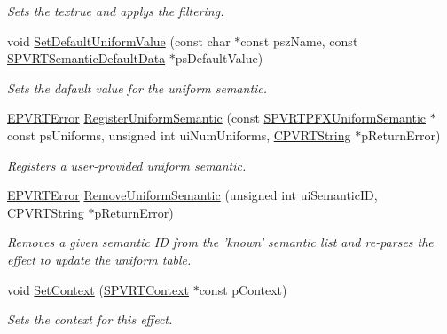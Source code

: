 \begin{DoxyCompactItemize}
\begin{DoxyCompactList}\small\item\em Sets the textrue and applys the filtering. \end{DoxyCompactList}\item 
void \hyperlink{class_c_p_v_r_t_p_f_x_effect_a3b08f2f371bf7aad946a8783631371a2}{Set\+Default\+Uniform\+Value} (const char $\ast$const psz\+Name, const \hyperlink{struct_s_p_v_r_t_semantic_default_data}{S\+P\+V\+R\+T\+Semantic\+Default\+Data} $\ast$ps\+Default\+Value)
\begin{DoxyCompactList}\small\item\em Sets the dafault value for the uniform semantic. \end{DoxyCompactList}\item 
\hyperlink{_p_v_r_t_error_8h_a9e837ff1a83f3a5f332bc4cc78454608}{E\+P\+V\+R\+T\+Error} \hyperlink{class_c_p_v_r_t_p_f_x_effect_a50041cb94518a8c4204e7b188cb45bff}{Register\+Uniform\+Semantic} (const \hyperlink{struct_s_p_v_r_t_p_f_x_uniform_semantic}{S\+P\+V\+R\+T\+P\+F\+X\+Uniform\+Semantic} $\ast$const ps\+Uniforms, unsigned int ui\+Num\+Uniforms, \hyperlink{class_c_p_v_r_t_string}{C\+P\+V\+R\+T\+String} $\ast$p\+Return\+Error)
\begin{DoxyCompactList}\small\item\em Registers a user-\/provided uniform semantic. \end{DoxyCompactList}\item 
\hyperlink{_p_v_r_t_error_8h_a9e837ff1a83f3a5f332bc4cc78454608}{E\+P\+V\+R\+T\+Error} \hyperlink{class_c_p_v_r_t_p_f_x_effect_a8cd988fd9b9fc6712221484cad2fe63e}{Remove\+Uniform\+Semantic} (unsigned int ui\+Semantic\+I\+D, \hyperlink{class_c_p_v_r_t_string}{C\+P\+V\+R\+T\+String} $\ast$p\+Return\+Error)
\begin{DoxyCompactList}\small\item\em Removes a given semantic I\+D from the 'known' semantic list and re-\/parses the effect to update the uniform table. \end{DoxyCompactList}\item 
void \hyperlink{class_c_p_v_r_t_p_f_x_effect_aeef3d3fb27e6eb06374e398cfb9eb70d}{Set\+Context} (\hyperlink{struct_s_p_v_r_t_context}{S\+P\+V\+R\+T\+Context} $\ast$const p\+Context)
\begin{DoxyCompactList}\small\item\em Sets the context for this effect. \end{DoxyCompactList}\item 

\end{DoxyCompactItemize}
